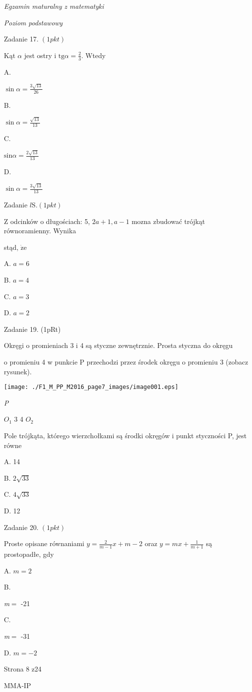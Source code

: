 \documentclass[a4paper,12pt]{article}
\begin{document}
{\it Egzamin maturalny z matematyki}

{\it Poziom podstawowy}

Zadanie 17. $(1pkt)$

Kąt $\alpha$ jest ostry i $\displaystyle \mathrm{t}\mathrm{g}\alpha=\frac{2}{3}$. Wtedy

A.

$\displaystyle \sin\alpha=\frac{3\sqrt{13}}{26}$

B.

$\displaystyle \sin\alpha=\frac{\sqrt{13}}{13}$

C.

$\mathrm{s}$i$\displaystyle \mathrm{n}\alpha=\frac{2\sqrt{13}}{13}$

D.

$\displaystyle \sin\alpha=\frac{3\sqrt{13}}{13}$

Zadanie $l\mathrm{S}. (1pkt)$

$\mathrm{Z}$ odcinków o długościach: 5, $2a+1, a-1$ mozna zbudować trójkąt równoramienny. Wynika

stąd, $\dot{\mathrm{z}}\mathrm{e}$

A. $a=6$

B. $a=4$

C. $a=3$

D. $a=2$

Zadanie 19. (1pRt)

Okręgi o promieniach 3 i 4 są styczne zewnętrznie. Prosta styczna do okręgu

o promieniu 4 w punkcie P przechodzi przez środek okręgu o promieniu 3 (zobacz rysunek).
\begin{center}
\texttt{[image: ./F1\_M\_PP\_M2016\_page7\_images/image001.eps]}
\end{center}
{\it P}

$O_{1}$  3 4  $O_{2}$

Pole trójkąta, którego wierzchołkami są środki okręgów i punkt styczności P, jest równe

A. 14

B. $2\sqrt{33}$

C. $4\sqrt{33}$

D. 12

Zadanie 20. $(1pkt)$

Proste opisane równaniami $y=\displaystyle \frac{2}{m-1}x+m-2$ oraz $y=mx+\displaystyle \frac{1}{m+1}$ są prostopadłe, gdy

A. $m=2$

B.

{\it m}$=$ -21

C.

{\it m}$=$ -31

D. $m=-2$

Strona 8 z24

MMA-IP
\end{document}
